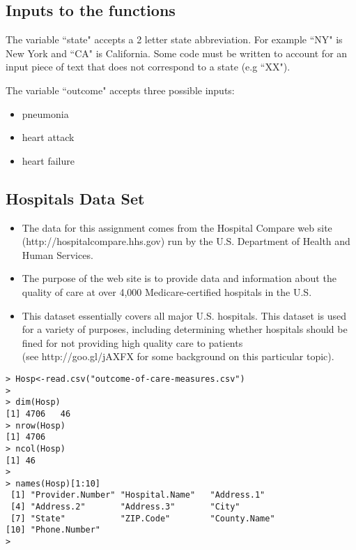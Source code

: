 \documentclass[]{article}
\begin{document}
\subsection{Inputs to the functions}
The variable ``state" accepts a 2 letter state abbreviation. For example ``NY" is New York and ``CA" is California. Some code must be written to account for an input piece of text that does not correspond to a state (e.g ``XX").

\noindent The variable ``outcome" accepts three possible inputs:
\begin{itemize}
\item pneumonia
\item heart attack
\item heart failure
\end{itemize}


\subsection{Hospitals Data Set}
\begin{itemize}
\item The data for this assignment comes from the Hospital Compare web site (http://hospitalcompare.hhs.gov)
run by the U.S. Department of Health and Human Services.
\item  The purpose of the web site is to provide data and
information about the quality of care at over 4,000 Medicare-certified hospitals in the U.S. 
\item This dataset essentially covers all major U.S. hospitals. This dataset is used for a variety of purposes, including determining
whether hospitals should be fined for not providing high quality care to patients \\ (see http://goo.gl/jAXFX
for some background on this particular topic).
\end{itemize}

\begin{verbatim}
> Hosp<-read.csv("outcome-of-care-measures.csv")
>
> dim(Hosp)
[1] 4706   46
> nrow(Hosp)
[1] 4706
> ncol(Hosp)
[1] 46
>
> names(Hosp)[1:10]
 [1] "Provider.Number" "Hospital.Name"   "Address.1"      
 [4] "Address.2"       "Address.3"       "City"           
 [7] "State"           "ZIP.Code"        "County.Name"    
[10] "Phone.Number"   
>
\end{verbatim}
\end{document}
